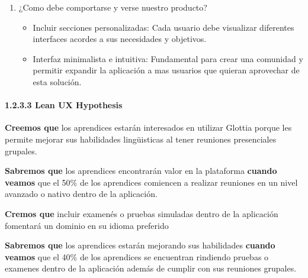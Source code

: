\begin{enumerate}
  \begin{itemize}
  \tightlist
  \item
    Reserva y asignación de espacio en la cafetería seleccionada de
    preferencia.
  \item
    Interfaz intuitiva y minimalista para optimizar el flujo de
    navegación.
  \item
    Dashboard visual que muestren diferentes campos asociados a la
    administración del local.
  \item
    Recompensar a los usuarios con premios dentro de la aplicación para
    fomentar su uso con frecuencia.
  \end{itemize}
\item
  ¿Como debe comportarse y verse nuestro producto?

  \begin{itemize}
  \tightlist
  \item
    Incluir secciones personalizadas: Cada usuario debe visualizar
    diferentes interfaces acordes a sus necesidades y objetivos.
  \item
    Interfaz minimalista e intuitiva: Fundamental para crear una
    comunidad y permitir expandir la aplicación a mas usuarios que
    quieran aprovechar de esta solución.
  \end{itemize}
\end{enumerate}

\paragraph{1.2.3.3 Lean UX
Hypothesis}\label{report__10-cap1-introduccion.md__lean-ux-hypothesis}

\textbf{Creemos que} los aprendices estarán interesados en utilizar
Glottia porque les permite mejorar sus habilidades lingüisticas al tener
reuniones presenciales grupales.

\textbf{Sabremos que} los aprendices encontrarán valor en la plataforma
\textbf{cuando veamos} que el 50\% de los aprendices comiencen a
realizar reuniones en un nivel avanzado o nativo dentro de la
aplicación.

\textbf{Cremos que} incluir examenés o pruebas simuladas dentro de la
aplicación fomentará un dominio en su idioma preferido

\textbf{Sabremos que} los aprendices estarán mejorando sus habilidades
\textbf{cuando veamos} que el 40\% de los aprendices se encuentran
rindiendo pruebas o examenes dentro de la aplicación además de cumplir
con sus reuniones grupales.


